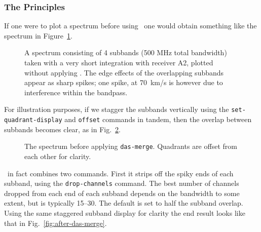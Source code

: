 \subsubsection{The Principles}
If one were to plot a spectrum before using \dm\ one would obtain
something like the spectrum in Figure~\ref{fig:dm_dirty}.
%
\begin{figure}[htb]
\centering
\leavevmode
\epsfxsize=4.0in
\vspace*{-0.5cm}
\begin{center}
\begin{minipage}[t]{5in}
\caption[Spectrum without \dm ]
{\small{A spectrum consisting of 4 subbands (500 MHz total bandwidth)
taken with a very short integration with receiver A2, plotted without
applying \dm .  The edge effects of the overlapping subbands appear as
sharp spikes; one spike, at 70~km/s is however due to interference
within the bandpass.}}
\label{fig:dm_dirty}
\end{minipage}
\end{center}
\end{figure}

For illustration purposes, if we stagger the subbands vertically
using the {\tt set-quadrant-display} and {\tt offset} commands in
tandem, then the overlap between subbands becomes clear, as in
Fig.~\ref{fig:before-das-merge}.

\begin{figure}[ht]
\begin{minipage}[t]{\textwidth}
\begin{minipage}[b]{0.5\textwidth}
\leavevmode
\centering
\epsfxsize=3.0in
\end{minipage}
\hfill
\begin{minipage}[b]{0.45\textwidth}
\caption[Before {\tt das-merge}]
{\small{The spectrum before applying {\tt das-merge}. Quadrants are
offset from each other for clarity.
\vspace*{2cm}
}}
\label{fig:before-das-merge}
\end{minipage}
\end{minipage}
\end{figure}

\dm\ in fact combines two commands. First it strips off the spiky ends of each
subband, using the {\tt drop-channels} command. The best number of
channels dropped from each end of each subband depends on the
bandwidth to some extent, but is typically 15--30. The default is set
to half the subband overlap. Using the same staggered subband display
for clarity the end result looks like that in Fig.~\ref{fig:after-das-merge}.

